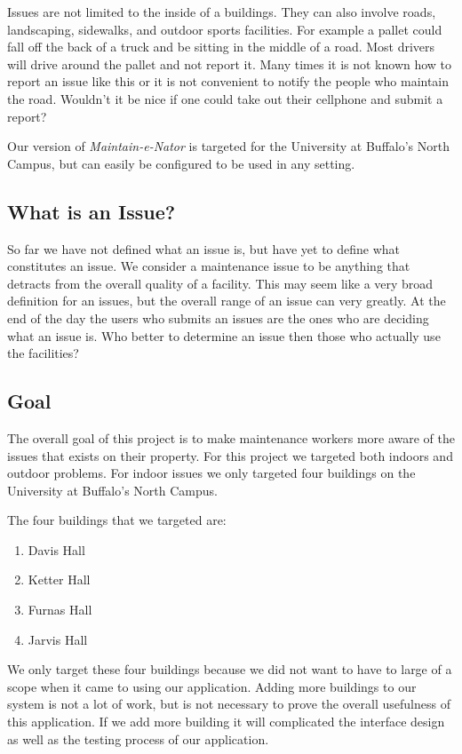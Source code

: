 \documentclass{acm_proc_article-sp}
\begin{document}
Issues are not limited to the inside of a buildings. They can also involve roads, landscaping, sidewalks, and outdoor sports facilities. For example a pallet could fall off the back of a truck and be sitting in the middle of a road. Most drivers will drive around the pallet and not report it. Many times it is not known how to report an issue like this or it is not convenient to notify the people who maintain the road. Wouldn't it be nice if one could take out their cellphone and submit a report? 

Our version of \textit{Maintain-e-Nator} is targeted for the University at Buffalo's North Campus, but can easily be configured to be used in any setting.

\subsection{What is an Issue?}
So far we have not defined what an issue is, but have yet to define what constitutes an issue. We consider a maintenance issue to be anything that detracts from the overall quality of a facility. This may seem like a very broad definition for an issues, but the overall range of an issue can very greatly. At the end of the day the users who submits an issues are the ones who are deciding what an issue is.  Who better to determine an issue then those who actually use the facilities?  

\subsection{Goal}
The overall goal of this project is to make maintenance workers more aware of the issues that exists on their property.
For this project we targeted both indoors and outdoor problems. For indoor issues we only targeted four buildings on the University at Buffalo's North Campus.

The four buildings that we targeted are:
\vspace{-4mm}
\begin{enumerate}[itemsep=0mm]
\item Davis Hall
\item Ketter Hall
\item Furnas Hall
\item Jarvis Hall
\end{enumerate}
\vspace{-2mm}

We only target these four buildings because we did not want to have to large of a scope when it came to using our application. Adding more buildings to our system is not a lot of work, but is not necessary to prove the overall usefulness of this application. If we add more building it will complicated the interface design as well as the testing process of our application.
\end{document}
